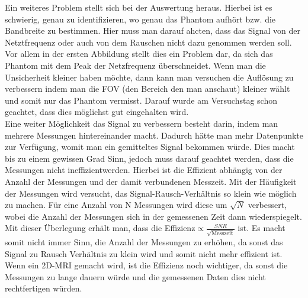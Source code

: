 Ein weiteres Problem stellt sich bei der Auswertung heraus. Hierbei ist es schwierig, genau zu identifizieren, wo genau das Phantom aufhört bzw. die Bandbreite zu bestimmen. Hier muss man darauf ahcten, dass das Signal von der Netztfrequenz oder auch von dem Rauschen nicht dazu genommen werden soll. Vor allem in der ersten Abbildung stellt dies ein Problem dar, da sich das Phantom mit dem Peak der Netzfrequenz überschneidet.
Wenn man die Unsicherheit kleiner haben möchte, dann kann man versuchen die Auflösung zu verbessern indem man die FOV (den Bereich den man anschaut) kleiner wählt und somit nur das Phantom vermisst. Darauf wurde am Versuchstag schon geachtet, dass dies möglichst gut eingehalten wird. \\
Eine weiter Möglichkeit das Signal zu verbessern besteht darin, indem man mehrere Messungen hintereinander macht. Dadurch hätte man mehr Datenpunkte zur Verfügung, womit man ein gemitteltes Signal bekommen würde. Dies macht bis zu einem gewissen Grad Sinn, jedoch muss darauf geachtet werden, dass die Messungen nicht \glqq ineffizient\grqq werden. Hierbei ist die Effizient abhängig von der Anzahl der Messungen und der damit verbundenen Messzeit. Mit der Häufigkeit der Messungen wird versucht, das Signal-Rausch-Verhältnis so klein wie möglich zu machen. Für eine Anzahl von N Messungen wird diese um $\sqrt{N}$ verbessert, wobei die Anzahl der Messungen sich in der gemessenen Zeit dann wiederspiegelt. Mit dieser Überlegung erhält man, dass die Effizienz$\propto\frac{SNR}{\sqrt{\text{Messzeit}}}$ ist. Es macht somit nicht immer Sinn, die Anzahl der Messungen zu erhöhen, da sonst das Signal zu Rausch Verhältnis zu klein wird und somit nicht mehr effizient ist.
Wenn ein 2D-MRI gemacht wird, ist die Effizienz noch wichtiger, da sonst die Messungen zu lange dauern würde und die gemessenen Daten dies nicht rechtfertigen würden. 